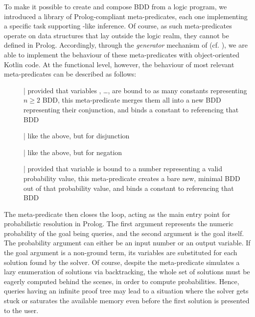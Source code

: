 \documentclass[12pt,a4paper,openright,twoside]{book}
\begin{document}
To make it possible to create and compose BDD from a logic program, we introduced a library of Prolog-compliant meta-predicates, each one implementing a specific task supporting \problog{}-like inference.
%
Of course, as such meta-predicates operate on data structures that lay outside the logic realm, they cannot be defined in Prolog.
%
Accordingly, through the \emph{generator} mechanism of \twopkt{} (cf. \cite{2pkt-jelia2021}), we are able to implement the behaviour of these meta-predicates with object-oriented Kotlin code.
%
At the functional level, however, the behaviour of most relevant meta-predicates can be described as follows:
%
\begin{description}
    \item[] | provided that variables , \ldots,  are bound to as many constants representing $n \geq 2$ BDD, this meta-predicate merges them all into a new BDD representing their conjunction, and binds a constant to  referencing that BDD

    \item[] | like the above, but for disjunction

    \item[] | like the above, but for negation

    \item[] | provided that variable  is bound to a number representing a valid probability value, this meta-predicate creates a bare new, minimal BDD out of that probability value, and binds a constant to  referencing that BDD
\end{description}

The  meta-predicate then closes the loop, acting as the main entry point for probabilistic resolution in Prolog.
%
The first argument represents the numeric probability of the goal being queries, and the second argument is the goal itself.
%
The probability argument can either be an input number or an output variable.
%
If the goal argument is a non-ground term, its variables are substituted for each solution found by the solver.
%
Of course, despite the  meta-predicate simulates a lazy enumeration of solutions via backtracking, the whole set of solutions must be eagerly computed behind the scenes, in order to compute probabilities.
%
Hence, queries having an infinite proof tree may lead to a situation where the solver gets stuck or saturates the available memory even before the first solution is presented to the user.
\end{document}
